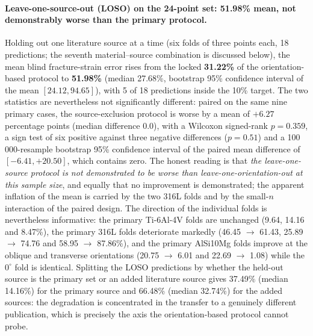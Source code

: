 \documentclass[12pt,a4paper,twocolumn]{article}
\providecommand{\ang}[1]{\ensuremath{#1^{\circ}}}
\begin{document}
\paragraph{Leave-one-source-out (LOSO) on the 24-point set: 51.98\% mean, not demonstrably worse than the primary protocol.}
Holding out one literature source at a time (six folds of three points each, 18 predictions; the seventh
material--source combination is discussed below), the mean blind fracture-strain error rises from the
locked \textbf{31.22\%} of the orientation-based protocol to \textbf{51.98\%} (median 27.68\%, bootstrap
95\% confidence interval of the mean $[24.12, 94.65]$), with 5 of 18 predictions inside the 10\% target.
The two statistics are nevertheless not significantly different: paired on the same nine primary cases,
the source-exclusion protocol is worse by a mean of $+6.27$ percentage points (median difference 0.0),
with a Wilcoxon signed-rank $p = 0.359$, a sign test of six positive against three negative differences
($p = 0.51$) and a 100\,000-resample bootstrap 95\% confidence interval of the paired mean difference of
$[-6.41, +20.50]$, which contains zero. The honest reading is that \emph{the leave-one-source protocol is
not demonstrated to be worse than leave-one-orientation-out at this sample size}, and equally that no
improvement is demonstrated; the apparent inflation of the mean is carried by the two 316L folds and by
the small-$n$ interaction of the paired design. The direction of the individual folds is nevertheless
informative: the primary Ti-6Al-4V folds are unchanged (9.64, 14.16 and 8.47\%), the primary 316L folds
deteriorate markedly (46.45 $\to$ 61.43, 25.89 $\to$ 74.76 and 58.95 $\to$ 87.86\%), and the primary
AlSi10Mg folds improve at the oblique and transverse orientations (20.75 $\to$ 6.01 and 22.69 $\to$ 1.08)
while the $\ang{0}$ fold is identical. Splitting the LOSO predictions by whether the held-out source is
the primary set or an added literature source gives 37.49\% (median 14.16\%) for the primary source and
66.48\% (median 32.74\%) for the added sources: the degradation is concentrated in the transfer to a
genuinely different publication, which is precisely the axis the orientation-based protocol cannot probe.
\end{document}
